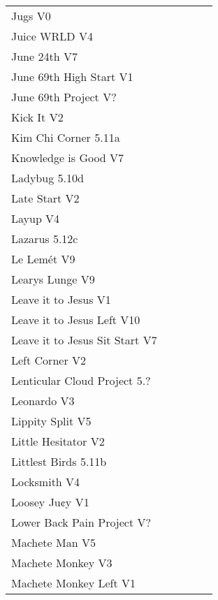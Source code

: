 \begin{flushleft}
\begin{center}
\begin{supertabular}{p{0.76\linewidth}p{0.08\linewidth}}
Jugs V0 & \pageref{rt:Jugs} \\
Juice WRLD V4 & \pageref{vr:Juice WRLD} \\
June 24th V7 & \pageref{rt:June 24th} \\
June 69th High Start V1 & \pageref{vr:June 69th High Start} \\
June 69th Project V? & \pageref{rt:June 69th Project} \\
Kick It V2 & \pageref{rt:Kick It} \\
Kim Chi Corner 5.11a & \pageref{rt:Kim Chi Corner} \\
Knowledge is Good V7 & \pageref{vr:Knowledge is Good} \\
Ladybug 5.10d & \pageref{rt:Ladybug} \\
Late Start V2 & \pageref{vr:Late Start} \\
Layup V4 & \pageref{vr:Layup} \\
Lazarus 5.12c & \pageref{vr:Lazarus} \\
Le Lemét V9 & \pageref{rt:Le Lemét} \\
Learys Lunge V9 & \pageref{vr:Learys Lunge} \\
Leave it to Jesus V1 & \pageref{rt:Leave it to Jesus} \\
Leave it to Jesus Left V10 & \pageref{vr:Leave it to Jesus Left} \\
Leave it to Jesus Sit Start V7 & \pageref{vr:Leave it to Jesus Sit Start} \\
Left Corner V2 & \pageref{rt:Left Corner} \\
Lenticular Cloud Project 5.? & \pageref{rt:Lenticular Cloud Project} \\
Leonardo V3 & \pageref{rt:Leonardo} \\
Lippity Split V5 & \pageref{rt:Lippity Split} \\
Little Hesitator V2 & \pageref{rt:June 1} \\
Littlest Birds 5.11b & \pageref{rt:Littlest Birds} \\
Locksmith V4 & \pageref{rt:Locksmith} \\
Loosey Ju¢y V1 & \pageref{rt:Loosey Ju¢y} \\
Lower Back Pain Project V? & \pageref{vr:Lower Back Pain Project} \\
Machete Man V5 & \pageref{vr:Machete Man} \\
Machete Monkey V3 & \pageref{rt:Machete Monkey} \\
Machete Monkey Left V1 & \pageref{vr:Machete Monkey Left} \\

\end{supertabular}
\end{center}
\end{flushleft}
